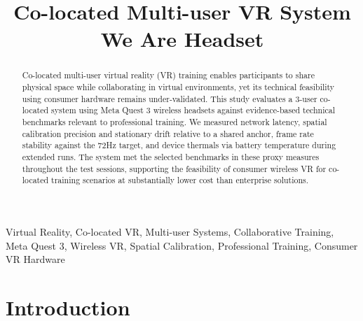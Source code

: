 \documentclass[conference]{IEEEtran}
\begin{document}
\title{Co-located Multi-user VR System\\ We Are Headset}

\author{
\and
{}
\and
{}
\and
{}
}

\maketitle


\begin{abstract}
Co-located multi-user virtual reality (VR) training enables participants to share physical space while collaborating in virtual environments, yet its technical feasibility using consumer hardware remains under-validated. This study evaluates a 3-user co-located system using Meta Quest 3 wireless headsets against evidence-based technical benchmarks relevant to professional training. We measured network latency, spatial calibration precision and stationary drift relative to a shared anchor, frame rate stability against the 72Hz target, and device thermals via battery temperature during extended runs. The system met the selected benchmarks in these proxy measures throughout the test sessions, supporting the feasibility of consumer wireless VR for co-located training scenarios at substantially lower cost than enterprise solutions.
\end{abstract}

\begin{IEEEkeywords}
Virtual Reality, Co-located VR, Multi-user Systems, Collaborative Training, Meta Quest 3, Wireless VR, Spatial Calibration, Professional Training, Consumer VR Hardware
\end{IEEEkeywords}


\section{Introduction}
\end{document}
